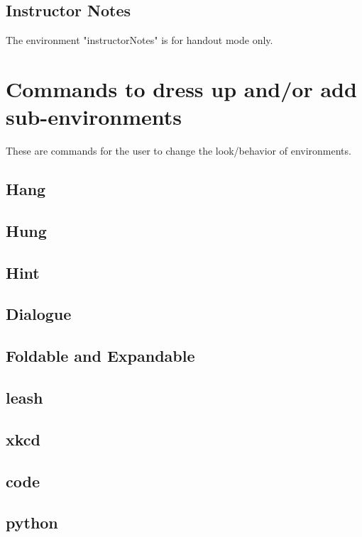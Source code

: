 \documentclass{ximera}
\begin{document}
\subsection{Instructor Notes}
The environment "instructorNotes" is for handout mode only.

\newpage
\section{Commands to dress up and/or add sub-environments}
These are commands for the user to change the look/behavior of environments.

\subsection{Hang}

\subsection{Hung}

\subsection{Hint}

\subsection{Dialogue}

\subsection{Foldable and Expandable}

\subsection{leash}

\subsection{xkcd}

\subsection{code}

\subsection{python}
\end{document}
